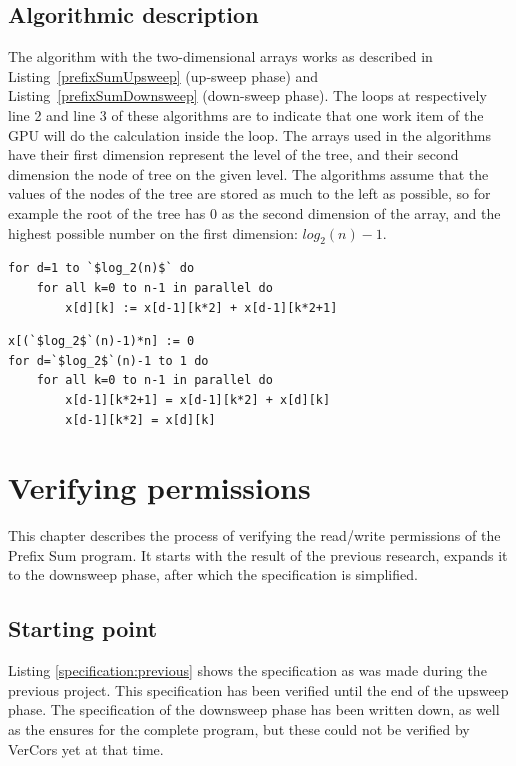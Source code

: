 \documentclass[a4paper]{article}
\begin{document}
\subsection{Algorithmic description} \label{sec:implAlgorithmic}
The algorithm with the two-dimensional arrays works as described in Listing~\ref{prefixSumUpsweep} (up-sweep phase) and Listing~\ref{prefixSumDownsweep} (down-sweep phase). The loops at respectively line 2 and line 3 of these algorithms are to indicate that one work item of the GPU will do the calculation inside the loop. The arrays used in the algorithms have their first dimension represent the level of the tree, and their second dimension the node of tree on the given level. The algorithms assume that the values of the nodes of the tree are stored as much to the left as possible, so for example the root of the tree has 0 as the second dimension of the array, and the highest possible number on the first dimension: $log_2(n)-1$.

\begin{lstlisting}[caption=Upsweep phase, label=prefixSumUpsweep, float=htpb]
for d=1 to `$log_2(n)$` do
	for all k=0 to n-1 in parallel do 
		x[d][k] := x[d-1][k*2] + x[d-1][k*2+1]
\end{lstlisting}

\begin{lstlisting}[caption=Downsweep phase, label=prefixSumDownsweep, float=htpb]
x[(`$log_2$`(n)-1)*n] := 0
for d=`$log_2$`(n)-1 to 1 do
	for all k=0 to n-1 in parallel do
		x[d-1][k*2+1] = x[d-1][k*2] + x[d][k]
		x[d-1][k*2] = x[d][k]
\end{lstlisting}
\FloatBarrier


\section{Verifying permissions}
This chapter describes the process of verifying the read/write permissions of the Prefix Sum program. It starts with the result of the previous research, expands it to the downsweep phase, after which the specification is simplified.

\subsection{Starting point}
Listing \ref{specification:previous} shows the specification as was made during the previous project. This specification has been verified until the end of the upsweep phase. The specification of the downsweep phase has been written down, as well as the ensures for the complete program, but these could not be verified by VerCors yet at that time.
\end{document}

